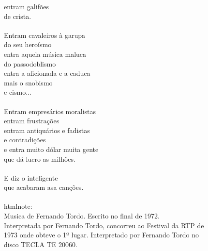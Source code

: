 \documentclass{article}
\begin{document}
entram galifões \\
de crista. \\
\\
Entram cavaleiros à garupa \\
do seu heroísmo \\
entra aquela música maluca \\
do passodoblismo \\
entra a aficionada e a caduca \\
mais o snobismo \\
e cismo... \\
\\
Entram empresários moralistas \\
entram frustrações \\
entram antiquários e fadistas \\
e contradições \\
e entra muito dólar muita gente \\
que dá lucro as milhões. \\
\\
E diz o inteligente \\
que acabaram asa canções. \\
\\
htmlnote:\\
Musica de Fernando Tordo.  Escrito no final de 1972.\\
Interpretada por Fernando Tordo, concorreu ao Festival da RTP de\\
1973 onde obteve o 1º lugar. Interpretado por Fernando Tordo no\\
disco TECLA TE 20060.\\
\end{document}
